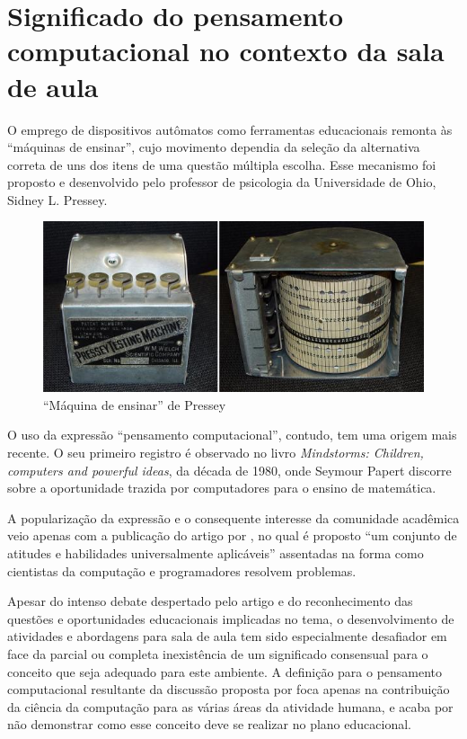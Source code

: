 \section{Significado do pensamento computacional no contexto da sala de aula}

O emprego de dispositivos autômatos como ferramentas educacionais remonta às ``máquinas de ensinar'', cujo movimento dependia da seleção da alternativa correta de uns dos itens de uma questão múltipla escolha. Esse mecanismo foi proposto e desenvolvido pelo professor de psicologia da Universidade de Ohio,  Sidney L. Pressey.

\begin{figure}[!htb]
	\caption{``Máquina de ensinar'' de Pressey}
	\begin{center}
	    \includegraphics[scale=0.7]{imagens/pressey}
	\end{center}
	\label{fig:pressey}
\end{figure}

O uso da expressão ``pensamento computacional'', contudo, tem uma origem mais recente. O seu primeiro registro é observado no livro \textit{Mindstorms: Children, computers and powerful ideas}, da década de 1980, onde Seymour Papert discorre sobre a oportunidade trazida por computadores para o ensino de matemática. 

A popularização da expressão e o consequente interesse da comunidade acadêmica veio apenas com a publicação do artigo por , no qual é proposto ``um conjunto de atitudes e habilidades universalmente aplicáveis'' assentadas na forma como cientistas da computação e programadores resolvem problemas.

Apesar do intenso debate despertado pelo artigo e do reconhecimento das questões e oportunidades educacionais implicadas no tema, o desenvolvimento de atividades e abordagens para sala de aula tem sido especialmente desafiador em face da parcial ou completa inexistência de um significado consensual para o conceito que seja adequado para este ambiente. A definição para o pensamento computacional resultante da discussão proposta por  foca apenas na contribuição da ciência da computação para as várias áreas da atividade humana, e acaba por não demonstrar como esse conceito deve se realizar no plano educacional.

